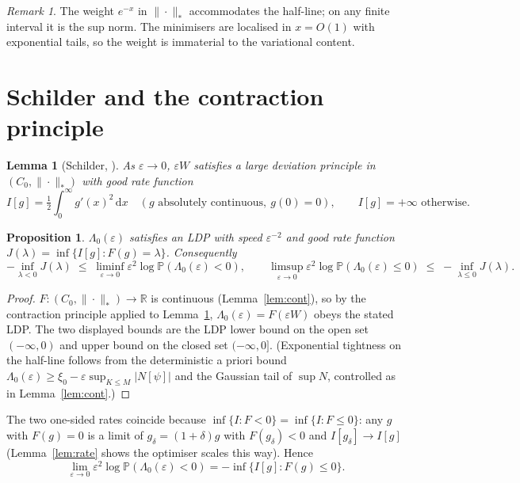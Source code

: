 \documentclass[11pt]{article}
\newtheorem{lemma}{Lemma}
\newtheorem{proposition}{Proposition}
\theoremstyle{remark}
\newtheorem*{remark}{Remark}
\newcommand{\dd}{\,\mathrm{d}}
\newcommand{\R}{\mathbb{R}}
\newcommand{\Kf}{K}
\newcommand{\Lam}{\Lambda_0}
\begin{document}
\begin{remark}
The weight $e^{-x}$ in $\|\cdot\|_*$ accommodates the half-line; on any finite interval
it is the sup norm. The minimisers are localised in $x=O(1)$ with exponential tails, so
the weight is immaterial to the variational content.
\end{remark}

\section{Schilder and the contraction principle}\label{sec:schilder}

\begin{lemma}[Schilder, {\cite[Thm.~5.2.3]{DZ}}]\label{lem:schilder}
As $\varepsilon\to0$, $\varepsilon W$ satisfies a large deviation principle in
$(C_0,\|\cdot\|_*)$ with good rate function
\[
  I[g]=\tfrac12\int_0^\infty g'(x)^2\dd x \quad(g\text{ absolutely continuous},\ g(0)=0),
  \qquad I[g]=+\infty\text{ otherwise.}
\]
\end{lemma}

\begin{proposition}\label{prop:ldp}
$\Lam(\varepsilon)$ satisfies an LDP with speed $\varepsilon^{-2}$ and good rate
function $J(\lambda)=\inf\{I[g]:F(g)=\lambda\}$. Consequently
\[
  -\!\!\inf_{\lambda<0}\!\!J(\lambda)\;\le\;\liminf_{\varepsilon\to0}\varepsilon^2\log\mathbb P(\Lam(\varepsilon)<0),
  \qquad
  \limsup_{\varepsilon\to0}\varepsilon^2\log\mathbb P(\Lam(\varepsilon)\le 0)\;\le\;-\!\!\inf_{\lambda\le0}\!\!J(\lambda).
\]
\end{proposition}

\begin{proof}
$F:(C_0,\|\cdot\|_*)\to\R$ is continuous (Lemma~\ref{lem:cont}), so by the contraction
principle \cite[Thm.~4.2.1]{DZ} applied to Lemma~\ref{lem:schilder},
$\Lam(\varepsilon)=F(\varepsilon W)$ obeys the stated LDP. The two displayed bounds are
the LDP lower bound on the open set $(-\infty,0)$ and upper bound on the closed set
$(-\infty,0]$. (Exponential tightness on the half-line follows from the deterministic a
priori bound $\Lam(\varepsilon)\ge \xi_0-\varepsilon\sup_{\Kf\le M}|N[\psi]|$ and the
Gaussian tail of $\sup N$, controlled as in Lemma~\ref{lem:cont}.)
\end{proof}

The two one-sided rates coincide because $\inf\{I:F<0\}=\inf\{I:F\le0\}$: any $g$ with
$F(g)=0$ is a limit of $g_\delta=(1+\delta)g$ with $F(g_\delta)<0$ and
$I[g_\delta]\to I[g]$ (Lemma~\ref{lem:rate} shows the optimiser scales this way). Hence
\[
  \lim_{\varepsilon\to0}\varepsilon^2\log\mathbb P(\Lam(\varepsilon)<0)=-\inf\{I[g]:F(g)\le0\}.
\]
\end{document}
